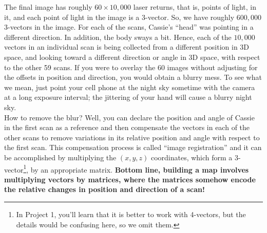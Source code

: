The final image has roughly $60 \times 10,000$ laser returns, that is, points of light, in it, and each point of light in the image is a 3-vector. So, we have roughly $600,000$ 3-vectors in the image. For each of the scans, Cassie's ``head'' was pointing in a different direction. In addition, the body sways a bit. Hence, each of the $10,000$ vectors in an individual scan is being collected from a different position in 3D space, and looking toward a different direction or angle in 3D space, with respect to the other 59 scans. If you were to overlay the 60 images without adjusting for the offsets in position and direction, you would obtain a blurry mess. To see what we mean, just point your cell phone at the night sky sometime with the camera at a long exposure interval; the jittering of your hand will cause a blurry night sky. \\

How to remove the blur? Well, you can declare the position and angle of Cassie in the first scan as a reference and then compensate the vectors in each of the other scans to remove variations in its relative position and angle with respect to the first scan. This compensation process is called ``image registration'' and it can be accomplished by multiplying the $(x, y, z)$ coordinates, which form a 3-vector\footnote{In Project 1, you'll learn that it is better to work with 4-vectors, but the details would be confusing here, so we omit them.}, by an appropriate matrix. \textbf{Bottom line, building a map involves multiplying vectors by matrices, where the matrices somehow encode the relative changes in position and direction of a scan!} \\


